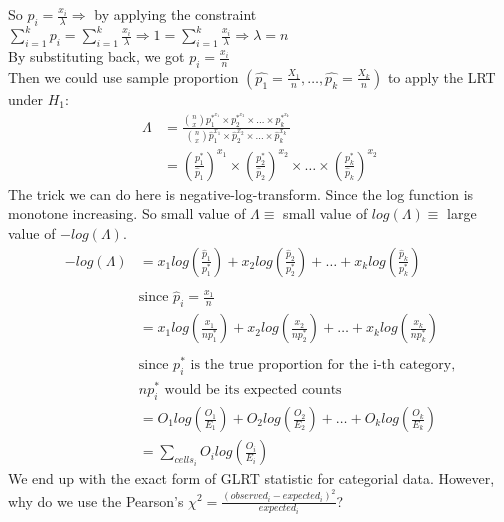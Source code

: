 \documentclass[12pt ]{article}
\begin{document}
So $p_{i}=\frac{x_{i}}{\lambda} \Rightarrow$ by applying the constraint $\sum_{i=1}^{k} p_{i}=\sum_{i=1}^{k} \frac{x_{i}}{\lambda} \Rightarrow 1 = \sum_{i=1}^{k} \frac{x_{i}}{\lambda} \Rightarrow \lambda = n$ \\
By substituting back, we got $p_{i} = \frac{x_{i}}{n}$ \\

\color{black}
Then we could use sample proportion $(\hat{p_{1}} = \frac{X_{1}}{n}, \ldots, \hat{p_{k}} = \frac{X_{k}}{n})$ to apply the LRT under $H_{1}$:
\begin{align*}
\Lambda &= \frac{ {n \choose x}p_{1}^{*^{x_{1}}} \times p_{2}^{*^{x_{2}}} \times \ldots \times p_{k}^{*^{x_{k}}}} {{n \choose x}\hat{p}_{1}^{x_{1}} \times \hat{p}_{2}^{x_{2}} \times \ldots \times \hat{p}_{k}^{x_{k}}} \\
&= (\frac{p_{1}^{*}}{\hat{p}_{1}})^{x_{1}} \times (\frac{p_{2}^{*}}{\hat{p}_{2}})^{x_{2}} \times \ldots \times (\frac{p_{k}^{*}}{\hat{p}_{k}})^{x_{2}}
\end{align*}
The trick we can do here is negative-log-transform. Since the log function is monotone increasing. So small value of $\Lambda \equiv$ small value of $log(\Lambda) \equiv$ large value of $-log(\Lambda)$. 
\begin{align*}
-log(\Lambda) &= x_{1} log(\frac{\hat{p}_{1}}{p_{1}^{*}}) + x_{2} log(\frac{\hat{p}_{2}}{p_{2}^{*}}) + \ldots + x_{k} log(\frac{\hat{p}_{k}}{p_{k}^{*}}) \\
& \\
& \text{since $\hat{p}_{i} = \frac{x_{1}}{n}$} \\
&=  x_{1} log(\frac{x_{1}}{np_{1}^{*}}) + x_{2} log(\frac{x_{2}}{np_{2}^{*}}) + \ldots + x_{k} log(\frac{x_{k}}{np_{k}^{*}}) \\
&\\
& \text{since $p_{i}^{*}$ is the true proportion for the i-th category,} \\
& \text{$np_{i}^{*}$ would be its expected counts}\\
&= O_{1} log(\frac{O_{1}}{E_{1}}) + O_{2} log(\frac{O_{2}}{E_{2}}) + \ldots + O_{k} log(\frac{O_{k}}{E_{k}})\\
&= \sum_{cells_{i}} O_{i} log(\frac{O_{i}}{E_{i}})
\end{align*}
We end up with the exact form of GLRT statistic for categorial data. However, why do we use the Pearson's $\chi^2 = \frac{(observed_{i} - expected_{i})^2}{expected_{i}}$? \\
\end{document}
